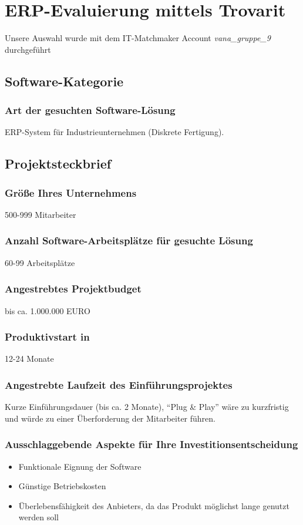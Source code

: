 \section{ERP-Evaluierung mittels Trovarit}
Unsere Auswahl wurde mit dem IT-Matchmaker Account \textit{vana\_gruppe\_9} durchgeführt


\subsection{Software-Kategorie}
\subsubsection{Art der gesuchten Software-Lösung}
\label{sssec_art}
ERP-System für Industrieunternehmen (Diskrete Fertigung).
\subsection{Projektsteckbrief}
\subsubsection{Größe Ihres Unternehmens}
500-999 Mitarbeiter
\subsubsection{Anzahl Software-Arbeitsplätze für gesuchte Lösung}
60-99 Arbeitsplätze
\subsubsection{Angestrebtes Projektbudget}
bis ca. 1.000.000 EURO
\subsubsection{Produktivstart in}
12-24 Monate
\subsubsection{Angestrebte Laufzeit des Einführungsprojektes}
Kurze Einführungsdauer (bis ca. 2 Monate), \enquote{Plug \& Play} wäre zu kurzfristig und würde zu einer Überforderung der Mitarbeiter führen.
\subsubsection{Ausschlaggebende Aspekte für Ihre Investitionsentscheidung}
\begin{itemize}
	\item Funktionale Eignung der Software
	\item Günstige Betriebskosten
	\item Überlebensfähigkeit des Anbieters, da das Produkt möglichst lange genutzt werden soll
\end{itemize}
